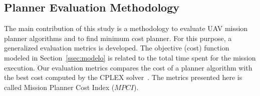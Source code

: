 \documentclass[conference,harvard,brazil,english]{sbatex}
\begin{document}
%
%
%
%
%
%
%
\subsection{Planner Evaluation Methodology}
\label{ssec:evaluationmethod}

The main contribution of this study is a methodology to evaluate UAV mission planner algorithms and to find minimum cost planner. For this purpose, a generalized evaluation metrics is developed. The objective (cost) function modeled in Section~\ref{ssec:modelo} is related to the total time spent for the mission execution. Our evaluation metrics compares the cost of a planner algorithm with the best cost computed by the CPLEX solver~\cite{cplex2003ilog}. The metrics presented here is called Mission Planner Cost Index ($MPCI$).
\end{document}
